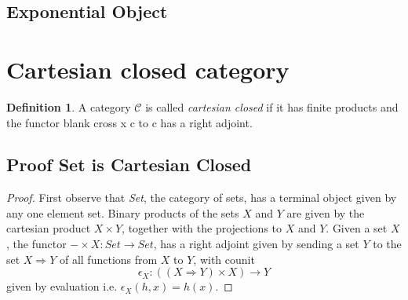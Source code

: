 \documentclass{article}
\theoremstyle{definition}
\newtheorem{definition}{Definition}[section]
\newcommand{\C}{\mathcal{C}}
\begin{document}
\subsection{Exponential Object}

\pagebreak
\section{Cartesian closed category}

\begin{definition}
    A category $\C$ is called \textit{cartesian closed}
    if it has finite products
    and the functor %
    blank cross x c to c has a right adjoint.
\end{definition}

\subsection{Proof Set is Cartesian Closed}
\begin{proof}
    First observe that \textit{Set}, the category of sets,
    has a terminal object given by any one element set.
    Binary products of the sets $X$ and $Y$ are given by the
    cartesian product $X \times Y$,
    together with the projections to $X$ and $Y$.
    Given a set $X$, the functor $- \times X : Set \rightarrow Set$,
    has a right adjoint given by
    sending a set $Y$ to the set $X \Rightarrow Y$ of all functions from $X$ to $Y$,
    with counit
    $$\epsilon_X : ((X \Rightarrow Y) \times X) \rightarrow Y$$
    given by evaluation i.e. $\epsilon_X(h,x) = h(x)$.
\end{proof}
\end{document}
